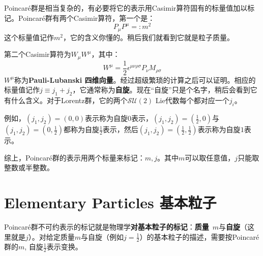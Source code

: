 Poincar\'e群是相当复杂的，有必要将它的表示用Casimir算符固有的标量值加以标记。Poincar\'e群有两个Casimir算符，第一个是：
\begin{equation}
\label{equ3.258}
    P_\mu P^\mu =: m^2
\end{equation}
这个标量值记作$m^2$，它的含义你懂的。稍后我们就看到它就是粒子质量。

第二个Casimir算符为$W_\mu W^\mu$，其中：
\begin{equation}
\label{equ3.259}
    W^\mu = \frac{1}{2} \epsilon^{\mu \nu \rho \sigma} P_{\nu} M_{\rho \sigma}
\end{equation}
$W^\mu$称为{\bf Pauli-Lubanski 四维向量}。经过超级繁琐的计算之后可以证明。相应的标量值记作$j \equiv j_1 + j_2$，它通常称为{\bf 自旋}。现在“自旋”只是个名字，稍后会看到它有什么含义。对于Lorentz群，它的两个$\mathcal{SU}(2)$ Lie代数每个都对应一个$j_i$。

例如，$(j_1, j_2) = (0, 0)$表示称为自旋$0$表示，$(j_1, j_2) = (\frac{1}{2}, 0)$与$(j_1, j_2) = (0, \frac{1}{2})$都称为自旋$\frac{1}{2}$表示，然后$(j_1, j_2) = (\frac{1}{2}, \frac{1}{2})$表示称为自旋$1$表示。

综上，Poincar\'e群的表示用两个标量来标记：$m, j$。其中$m$可以取任意值，$j$只能取整数或半整数。

\section[基本粒子]{Elementary Particles \quad 基本粒子}
\label{sec3.9}
Poincar\'e群不可约表示的标记就是物理学{\bf 对基本粒子的标记}：{\bf 质量}\, $m$与{\bf 自旋}（这里就是$j$）。对给定质量$m$与自旋（例如$j = \frac{1}{2}$）的基本粒子的描述，需要按Poincar\'e群的$m$, 自旋$\frac{1}{2}$表示变换。

